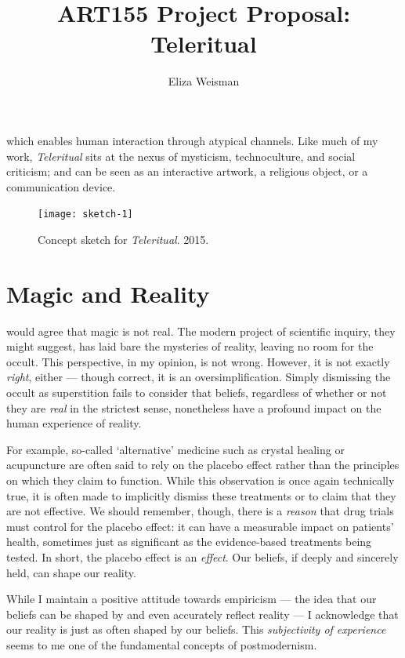 \documentclass[a4paper,nobib]{tufte-handout}
\title[Teleritual]{\textbf{ART155 Project Proposal:} Teleritual}
\author{Eliza Weisman}
\begin{document}
\maketitle

 which enables human interaction through atypical channels. Like much of my work, \textit{Teleritual} sits at the nexus of mysticism, technoculture, and social criticism; and can be seen as an interactive artwork, a religious object, or a communication device.
\begin{figure}
    \texttt{[image: sketch-1]}
    \caption{Concept sketch for \emph{Teleritual}. 2015.}
    \label{fig:sketch1}
\end{figure}

\section{Magic and Reality}

 would agree that magic is not real. The modern project of scientific inquiry, they might suggest, has laid bare the mysteries of reality, leaving no room for the occult. This perspective, in my opinion, is not wrong. However, it is not exactly \emph{right}, either --- though correct, it is an oversimplification. Simply dismissing the occult as superstition fails to consider that beliefs, regardless of whether or not they are \emph{real} in the strictest sense, nonetheless have a profound impact on the human experience of reality.


For example, so-called `alternative' medicine such as crystal healing or acupuncture are often said to rely on the placebo effect rather than the principles on which they claim to function. While this observation is once again technically true, it is often made to implicitly dismiss these treatments or to claim that they are not effective.  We should remember, though, there is a \emph{reason} that drug trials must control for the placebo effect: it can have a measurable impact on patients' health, sometimes just as significant as the evidence-based treatments being tested. In short, the placebo effect is an \emph{effect}. Our beliefs, if deeply and sincerely held, can shape our reality.

While I maintain a positive attitude towards empiricism --- the idea that our beliefs can be shaped by and even accurately reflect reality\autocite{sep:logicalempiricism} --- I acknowledge that our reality is just as often shaped by our beliefs. This \emph{subjectivity of experience}\autocite{nagel1974like} seems to me one of the fundamental concepts of postmodernism.
\end{document}
